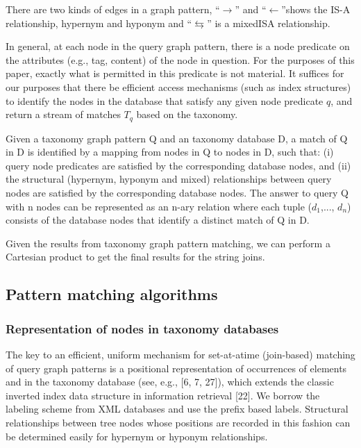 \documentclass{sig-alternate}
\begin{document}
There are two kinds of edges in a graph pattern, ``$\rightarrow$'' and ``$\leftarrow$''shows the IS-A relationship, hypernym and hyponym and ``$\leftrightarrows$'' is a mixedISA relationship.

In general, at each node in the query graph pattern, there is
a node predicate on the attributes (e.g., tag, content) of the
node in question. For the purposes of this paper, exactly
what is permitted in this predicate is not material.  It suffices
for our purposes that there be efficient access mechanisms
(such as index structures) to identify the nodes in the
database that satisfy any given node predicate $q$, and
return a stream of matches $T_q$ based on the taxonomy.


Given a taxonomy graph pattern Q and an taxonomy database D, a
match of Q in D is identified by a mapping from nodes in Q
to nodes in D, such that: (i) query node predicates are satisfied
by the corresponding database nodes, and (ii) the structural (hypernym, hyponym and
mixed) relationships between query nodes are
satisfied by the corresponding database nodes. The answer
to query Q with n nodes can be represented as an n-ary relation
where each tuple ($d_1$,..., $d_n$) consists of the database
nodes that identify a distinct match of Q in D.

Given the results from taxonomy graph pattern matching, we can perform a Cartesian product to get the final results for the string joins.

\subsection{Pattern matching algorithms}

\subsubsection{Representation of nodes in taxonomy databases}

The key to an efficient, uniform mechanism for set-at-atime
(join-based) matching of query graph patterns is a positional
representation of occurrences of  elements and in the taxonomy database (see, e.g., [6, 7, 27]),
which extends the classic inverted index data structure in information retrieval [22]. We borrow the labeling scheme from XML databases and use the prefix based labels. Structural relationships between tree nodes whose positions
are recorded in this fashion can be determined easily for hypernym or hyponym relationships.
\end{document}
